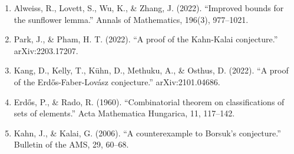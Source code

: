 \begin{enumerate}
\item Alweiss, R., Lovett, S., Wu, K., \& Zhang, J. (2022). ``Improved bounds for the sunflower lemma.'' Annals of Mathematics, 196(3), 977--1021.
\item Park, J., \& Pham, H. T. (2022). ``A proof of the Kahn-Kalai conjecture.'' arXiv:2203.17207.
\item Kang, D., Kelly, T., K\"{u}hn, D., Methuku, A., \& Osthus, D. (2022). ``A proof of the Erd\H{o}s-Faber-Lov\'{a}sz conjecture.'' arXiv:2101.04686.
\item Erd\H{o}s, P., \& Rado, R. (1960). ``Combinatorial theorem on classifications of sets of elements.'' Acta Mathematica Hungarica, 11, 117--142.
\item Kahn, J., \& Kalai, G. (2006). ``A counterexample to Borsuk's conjecture.'' Bulletin of the AMS, 29, 60--68.
\end{enumerate}
